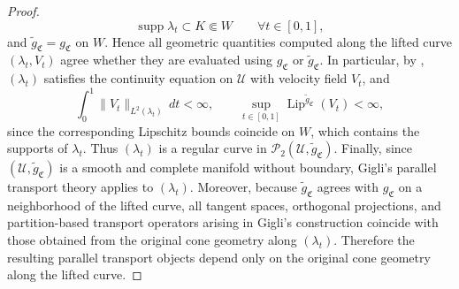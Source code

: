 \documentclass[11pt]{article}
\begin{document}
\begin{proof}
    \[
    \operatorname{supp}\lambda_t \subset K \Subset W
    \qquad \forall t\in[0,1],
    \]
    and $\widetilde g_{\mathfrak C}=g_{\mathfrak C}$ on $W$. Hence all geometric quantities computed
    along the lifted curve $(\lambda_t,V_t)$ agree whether they are evaluated using $g_{\mathfrak C}$
    or $\widetilde g_{\mathfrak C}$. In particular, by ,
    $(\lambda_t)$ satisfies the continuity equation on $\mathcal U$ with velocity field $V_t$, and
    \[
    \int_0^1 \|V_t\|_{L^2(\lambda_t)}\,dt < \infty,
    \qquad
    \sup_{t \in [0,1]} \operatorname{Lip}^{\widetilde g_{\mathfrak C}}(V_t) < \infty,
    \]
    since the corresponding Lipschitz bounds coincide on $W$, which contains the supports of
    $\lambda_t$. Thus $(\lambda_t)$ is a regular curve in
    $\mathcal P_2(\mathcal U,\widetilde g_{\mathfrak C})$. Finally, since $(\mathcal U,\widetilde g_{\mathfrak C})$ is a smooth and complete manifold without
    boundary, Gigli's parallel transport theory applies to $(\lambda_t)$. Moreover, because
    $\widetilde g_{\mathfrak C}$ agrees with $g_{\mathfrak C}$ on a neighborhood of the lifted curve,
    all tangent spaces, orthogonal projections, and partition-based transport operators arising in
    Gigli's construction coincide with those obtained from the original cone geometry along
    $(\lambda_t)$. Therefore the resulting parallel transport objects depend only on the original
    cone geometry along the lifted curve.
\end{proof}

{}
\end{document}
